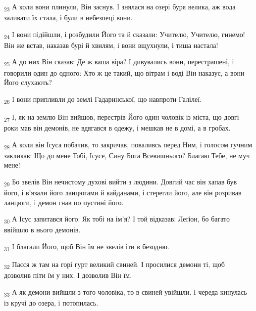 \begin{tcolorbox}
\textsubscript{23} А коли вони плинули, Він заснув. І знялася на озері буря велика, аж вода заливати їх стала, і були в небезпеці вони.
\end{tcolorbox}
\begin{tcolorbox}
\textsubscript{24} І вони підійшли, і розбудили Його та й сказали: Учителю, Учителю, гинемо! Він же встав, наказав бурі й хвилям, і вони вщухнули, і тиша настала!
\end{tcolorbox}
\begin{tcolorbox}
\textsubscript{25} А до них Він сказав: Де ж ваша віра? І дивувались вони, перестрашені, і говорили один до одного: Хто ж це такий, що вітрам і воді Він наказує, а вони Його слухають?
\end{tcolorbox}
\begin{tcolorbox}
\textsubscript{26} І вони припливли до землі Гадаринської, що навпроти Галілеї.
\end{tcolorbox}
\begin{tcolorbox}
\textsubscript{27} І, як на землю Він вийшов, перестрів Його один чоловік із міста, що довгі роки мав він демонів, не вдягався в одежу, і мешкав не в домі, а в гробах.
\end{tcolorbox}
\begin{tcolorbox}
\textsubscript{28} А коли він Ісуса побачив, то закричав, поваливсь перед Ним, і голосом гучним закликав: Що до мене Тобі, Ісусе, Сину Бога Всевишнього? Благаю Тебе, не муч мене!
\end{tcolorbox}
\begin{tcolorbox}
\textsubscript{29} Бо звелів Він нечистому духові вийти з людини. Довгий час він хапав був його, і в'язали його ланцюгами й кайданами, і стерегли його, але він розривав ланцюги, і демон гнав по пустині його.
\end{tcolorbox}
\begin{tcolorbox}
\textsubscript{30} А Ісус запитався його: Як тобі на ім'я? І той відказав: Леґіон, бо багато ввійшло в нього демонів.
\end{tcolorbox}
\begin{tcolorbox}
\textsubscript{31} І благали Його, щоб Він їм не звелів іти в безодню.
\end{tcolorbox}
\begin{tcolorbox}
\textsubscript{32} Пасся ж там на горі гурт великий свиней. І просилися демони ті, щоб дозволив піти їм у них. І дозволив Він їм.
\end{tcolorbox}
\begin{tcolorbox}
\textsubscript{33} А як демони вийшли з того чоловіка, то в свиней увійшли. І череда кинулась із кручі до озера, і потопилась.
\end{tcolorbox}
